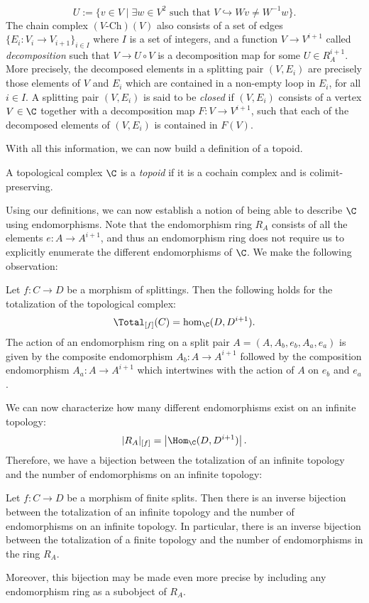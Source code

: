 \documentclass[a4paper,reqno,oneside]{article}
\begin{document}
$$
U:=\{v \in V \mid \exists w \in V^{2} \text{ such that } V \hookrightarrow Wv \neq W^{-1}w\}.
$$
The chain complex $(V\text{-}\mathrm{Ch})(V)$ also consists of a set of edges $\{E_i: V_i \rightarrow V_{i+1}\}_{i \in I}$ where $I$ is a set of integers, and a function $V \rightarrow V^{i+1}$ called \textit{decomposition} such that $V \rightarrow U \circ V$ is a decomposition map for some $U \in R_{A}^{i+1}$.  More precisely, the decomposed elements in a splitting pair $(V, E_i)$ are precisely those elements of $V$ and $E_i$ which are contained in a non-empty loop in $E_i$, for all $i \in I$.  A splitting pair $(V, E_i)$ is said to be \textit{closed} if $(V, E_i)$ consists of a vertex $V \in \C$ together with a decomposition map $F: V \rightarrow V^{i+1}$, such that each of the decomposed elements of $(V, E_i)$ is contained in $F(V)$.

With all this information, we can now build a definition of a topoid.
\begin{definition}
    A topological complex $\C$ is a \textit{topoid} if it is a cochain complex and is colimit-preserving.
\end{definition}
Using our definitions, we can now establish a notion of being able to describe $\C$ using endomorphisms.  Note that the endomorphism ring $R_A$ consists of all the elements $e: A \rightarrow A^{i+1}$, and thus an endomorphism ring does not require us to explicitly enumerate the different endomorphisms of $\C$.  We make the following observation:
\begin{lemma}
    Let $f: C \to D$ be a morphism of splittings. Then the following holds for the totalization of the topological complex:
    $$
    \Total_{[f]}(C) = \hom_{\C}(D, D^{i+1}).
    $$
    The action of an endomorphism ring on a split pair $A = (A, A_{b}, e_b, A_{a}, e_a)$ is given by the composite endomorphism $A_{b}: A \rightarrow A^{i+1}$ followed by the composition endomorphism $A_{a}: A \rightarrow A^{i+1}$ which intertwines with the action of $A$ on $e_b$ and $e_a$.
\end{lemma}

We can now characterize how many different endomorphisms exist on an infinite topology:
$$
|R_A|_{[f]} = \left\lvert \Hom_{\C}(D, D^{i+1}) \right\rvert.
$$
Therefore, we have a bijection between the totalization of an infinite topology and the number of endomorphisms on an infinite topology:
\begin{corollary}
    Let $f: C \to D$ be a morphism of finite splits. Then there is an inverse bijection between the totalization of an infinite topology and the number of endomorphisms on an infinite topology.  In particular, there is an inverse bijection between the totalization of a finite topology and the number of endomorphisms in the ring $R_A$.
\end{corollary}
Moreover, this bijection may be made even more precise by including any endomorphism ring as a subobject of $R_A$.
\end{document}
